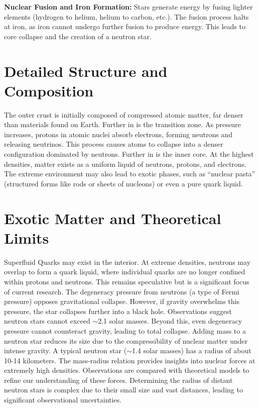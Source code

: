 \documentclass[12pt]{article}
\begin{document}
\textbf{Nuclear Fusion and Iron Formation:}
    Stars generate energy by fusing lighter elements (hydrogen to helium, helium to carbon, etc.). The fusion process halts at iron, as iron cannot undergo further fusion to produce energy. This leads to core collapse and the creation of a neutron star.

\section{Detailed Structure and Composition}
    The outer crust is initially composed of compressed atomic matter, far denser than materials found on Earth. Further in is the transition zone. As pressure increases, protons in atomic nuclei absorb electrons, forming neutrons and releasing neutrinos. This process causes atoms to collapse into a denser configuration dominated by neutrons. Further in is the inner core. At the highest densities, matter exists as a uniform liquid of neutrons, protons, and electrons. The extreme environment may also lead to exotic phases, such as ``nuclear pasta'' (structured forms like rods or sheets of nucleons) or even a pure quark liquid.


\section{Exotic Matter and Theoretical Limits}
    Superfluid Quarks may exist in the interior. At extreme densities, neutrons may overlap to form a quark liquid, where individual quarks are no longer confined within protons and neutrons. This remains speculative but is a significant focus of current research. The degeneracy pressure from neutrons (a type of Fermi pressure) opposes gravitational collapse. However, if gravity overwhelms this pressure, the star collapses further into a black hole. Observations suggest neutron stars cannot exceed $\sim$2.1 solar masses. Beyond this, even degeneracy pressure cannot counteract gravity, leading to total collapse. Adding mass to a neutron star reduces its size due to the compressibility of nuclear matter under intense gravity. A typical neutron star ($\sim$1.4 solar masses) has a radius of about 10-14 kilometers. The mass-radius relation provides insights into nuclear forces at extremely high densities. Observations are compared with theoretical models to refine our understanding of these forces. Determining the radius of distant neutron stars is complex due to their small size and vast distances, leading to significant observational uncertainties.
\end{document}
